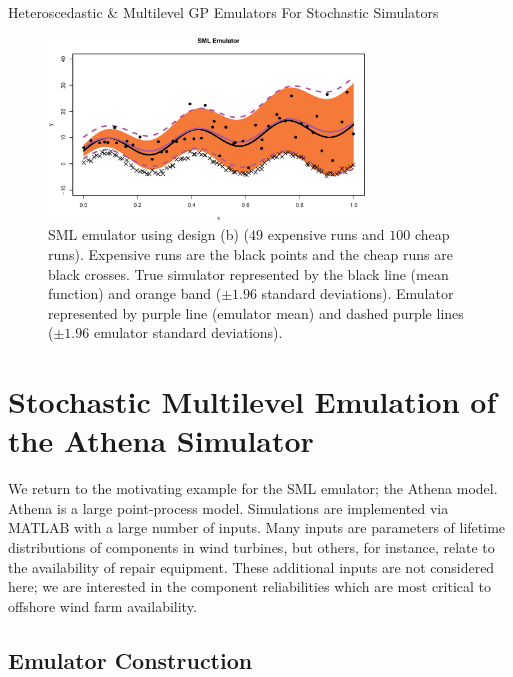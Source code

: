 \begin{chapter}{Heteroscedastic \& Multilevel GP Emulators For Stochastic Simulators\label{Ch:Hetsml}}
\begin{table}[h]
\end{table}
\begin{figure}[h]
	\centering
	\includegraphics[width=0.75\textwidth]{sml-het-fig/sml-example.eps}
	\caption{SML emulator using design (b) ($49$ expensive runs and $100$ cheap runs). Expensive runs are the black points and the cheap runs are black crosses. True simulator represented by the black line (mean function) and orange band ($\pm 1.96$ standard deviations). Emulator represented by purple line (emulator mean) and dashed purple lines ($\pm 1.96$ emulator standard deviations).}
	\label{Fig:comparison}
\end{figure}

\section{Stochastic Multilevel Emulation of the Athena Simulator}

We return to the motivating example for the SML emulator; the Athena model. Athena is a large point-process model. Simulations are implemented via MATLAB with a large number of inputs. Many inputs are parameters of lifetime distributions of components in wind turbines, but others, for instance, relate to the availability of repair equipment. These additional inputs are not considered here; we are interested in the component reliabilities which are most critical to offshore wind farm availability.

\subsection{Emulator Construction}


\end{chapter}
